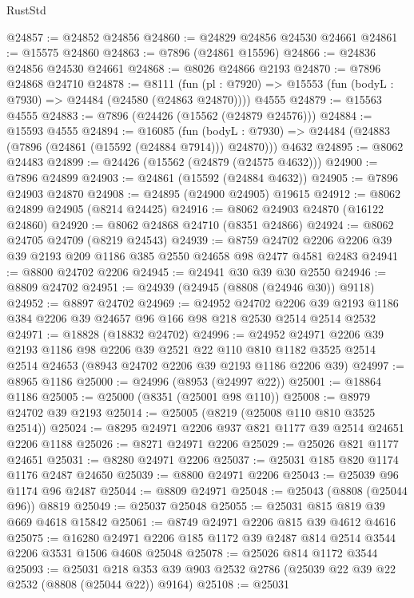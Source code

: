 \begin{lexlean}{RustStd}
\begin{coremodule}
@24857 := @24852 @24856
@24860 := @24829 @24856 @24530 @24661
@24861 := @15575 @24860
@24863 := @7896 (@24861 @15596)
@24866 := @24836 @24856 @24530 @24661
@24868 := @8026 @24866 @2193
@24870 := @7896 @24868 @24710
@24878 := @8111
    (fun (pl : @7920) => @15553 (fun (bodyL : @7930) => @24484 (@24580 (@24863 @24870))))
    @4555
@24879 := @15563 @4555
@24883 := @7896 (@24426 (@15562 (@24879 @24576)))
@24884 := @15593 @4555
@24894 := @16085
    (fun (bodyL : @7930) => @24484 (@24883 (@7896 (@24861 (@15592 (@24884 @7914))) @24870)))
    @4632
@24895 := @8062 @24483
@24899 := @24426 (@15562 (@24879 (@24575 @4632)))
@24900 := @7896 @24899
@24903 := @24861 (@15592 (@24884 @4632))
@24905 := @7896 @24903 @24870
@24908 := @24895 (@24900 @24905) @19615
@24912 := @8062 @24899 @24905 (@8214 @24425)
@24916 := @8062 @24903 @24870 (@16122 @24860)
@24920 := @8062 @24868 @24710 (@8351 @24866)
@24924 := @8062 @24705 @24709 (@8219 @24543)
@24939 := @8759 @24702 @2206 @2206 @39 @39 @2193 @209 @1186 @385 @2550 @24658 @98 @2477 @4581 @2483
@24941 := @8800 @24702 @2206
@24945 := @24941 @30 @39 @30 @2550
@24946 := @8809 @24702
@24951 := @24939 (@24945 (@8808 (@24946 @30)) @9118)
@24952 := @8897 @24702
@24969 := @24952
    @24702
    @2206
    @39
    @2193
    @1186
    @384
    @2206
    @39
    @24657
    @96
    @166
    @98
    @218
    @2530
    @2514
    @2514
    @2532
@24971 := @18828 (@18832 @24702)
@24996 := @24952
    @24971
    @2206
    @39
    @2193
    @1186
    @98
    @2206
    @39
    @2521
    @22
    @110
    @810
    @1182
    @3525
    @2514
    @2514
    @24653
    (@8943 @24702 @2206 @39 @2193 @1186 @2206 @39)
@24997 := @8965 @1186
@25000 := @24996 (@8953 (@24997 @22))
@25001 := @18864 @1186
@25005 := @25000 (@8351 (@25001 @98 @110))
@25008 := @8979 @24702 @39 @2193
@25014 := @25005 (@8219 (@25008 @110 @810 @3525 @2514))
@25024 := @8295 @24971 @2206 @937 @821 @1177 @39 @2514 @24651 @2206 @1188
@25026 := @8271 @24971 @2206
@25029 := @25026 @821 @1177 @24651
@25031 := @8280 @24971 @2206
@25037 := @25031 @185 @820 @1174 @1176 @2487 @24650
@25039 := @8800 @24971 @2206
@25043 := @25039 @96 @1174 @96 @2487
@25044 := @8809 @24971
@25048 := @25043 (@8808 (@25044 @96)) @8819
@25049 := @25037 @25048
@25055 := @25031 @815 @819 @39 @669 @4618 @15842
@25061 := @8749 @24971 @2206 @815 @39 @4612 @4616
@25075 := @16280 @24971 @2206 @185 @1172 @39 @2487 @814 @2514 @3544 @2206 @3531 @1506 @4608 @25048
@25078 := @25026 @814 @1172 @3544
@25093 := @25031
    @218
    @353
    @39
    @903
    @2532
    @2786
    (@25039 @22 @39 @22 @2532 (@8808 (@25044 @22)) @9164)
@25108 := @25031

\end{coremodule}
\end{lexlean}
